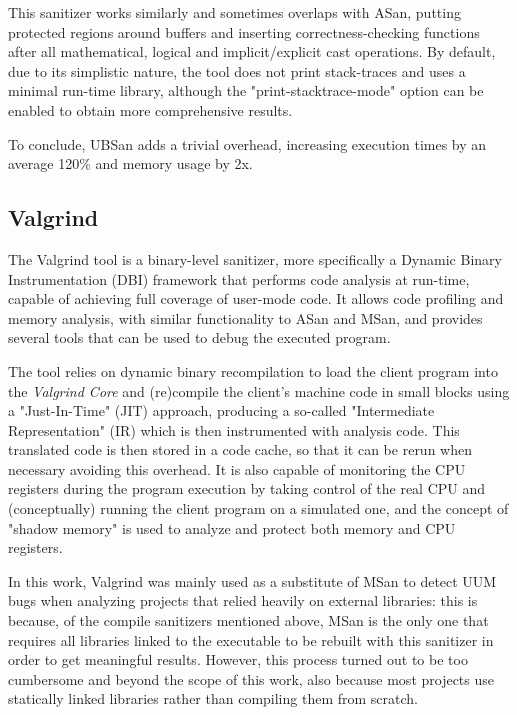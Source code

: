This sanitizer works similarly and sometimes overlaps with ASan, putting protected regions around buffers and inserting correctness-checking functions after all mathematical, logical and implicit/explicit cast operations. By default, due to its simplistic nature, the tool does not print stack-traces and uses a minimal run-time library, although the "print-stacktrace-mode" option can be enabled to obtain more comprehensive results.

To conclude, UBSan adds a trivial overhead, increasing execution times by an average 120\% and memory usage by 2x. \cite{ubsan_docs}



\subsection{Valgrind}
The Valgrind tool is a binary-level sanitizer, more specifically a Dynamic Binary Instrumentation (DBI) framework that performs code analysis at run-time, capable of achieving full coverage of user-mode code. \cite{Valgrind_1} \cite{Valgrind_2} It allows code profiling and memory analysis, with similar functionality to ASan and MSan, and provides several tools that can be used to debug the executed program.

The tool relies on dynamic binary recompilation to load the client program into the \textit{Valgrind Core} and (re)compile the client's machine code in small blocks using a "Just-In-Time" (JIT) approach, producing a so-called "Intermediate Representation" (IR) which is then instrumented with analysis code. This translated code is then stored in a code cache, so that it can be rerun when necessary avoiding this overhead. It is also capable of monitoring the CPU registers during the program execution by taking control of the real CPU and (conceptually) running the client program on a simulated one, and the concept of "shadow memory" is used to analyze and protect both memory and CPU registers.

In this work, Valgrind was mainly used as a substitute of MSan to detect UUM bugs when analyzing projects that relied heavily on external libraries: this is because, of the compile sanitizers mentioned above, MSan is the only one that requires all libraries linked to the executable to be rebuilt with this sanitizer in order to get meaningful results. However, this process turned out to be too cumbersome and beyond the scope of this work, also because most projects use statically linked libraries rather than compiling them from scratch.

